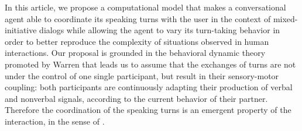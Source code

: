 
In this article, we propose a computational model that makes a conversational agent able to coordinate its speaking turns with the user in the context of mixed-initiative dialogs while allowing the agent to vary its turn-taking behavior in order to better reproduce the complexity of situations observed in human interactions. 
Our proposal is grounded in the behavioral dynamic theory promoted by Warren \cite{warren_dynamics_2006} that leads us to assume that the exchanges of turns are not under the control of one single participant, but result in their sensory-motor coupling: both participants are continuously adapting their production of verbal and nonverbal signals, according to the current behavior of their partner. Therefore the coordination of the speaking turns is an emergent property of the interaction, in the sense of \cite{warren_dynamics_2006}. 



